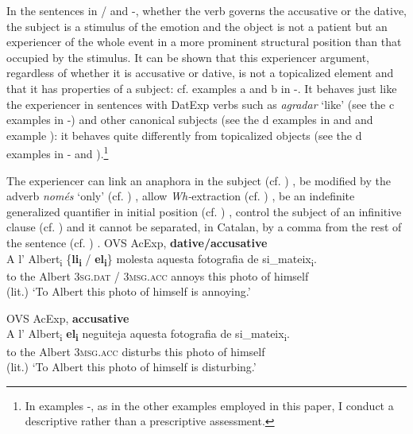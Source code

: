 \documentclass[output=paper,colorlinks,citecolor=brown,modfonts,nonflat]{langsci/langscibook}
\begin{document}
In the sentences in / and -, whether the verb governs the accusative or the dative, the subject is a stimulus of the emotion and the object is not a patient but an experiencer of the whole event in a more prominent structural position than that occupied by the stimulus. It can be shown that this experiencer argument, regardless of whether it is accusative or dative, is not a topicalized element and that it has properties of a subject: cf. examples {a} and {b} in -. It behaves just like the experiencer in sentences with DatExp verbs such as \textit{agradar} ‘like’ (see the {c} examples in -) and other canonical subjects (see the {d} examples in  and  and example ): it behaves quite differently from topicalized objects (see the {d} examples in - and ).\footnote{In examples -, as in the other examples employed in this paper, I conduct a descriptive rather than a prescriptive assessment.}

The experiencer can link an anaphora in the subject (cf. \citealt{Demonte1995, EgurenFernándezSoriano2004}) , be modified by the adverb \textit{només} ‘only’ (cf. \citealt{Cuervo1999}) , allow \textit{Wh-}extraction (cf. \citealt{BellettiRizzi1988}) , be an indefinite generalized quantifier in initial position (cf. \citealt{BellettiRizzi1988, Masullo1992quirky, Cuervo1999}) , control the subject of an infinitive clause (cf. \citealt{Campos1999, Alsina2008})  and it cannot be separated, in Catalan, by a comma from the rest of the sentence (cf. \citealt{Ginebra2003, Ginebra2005}) .
\textbf{}
\ea%
 \label{ex:royo:8}
 \ea OVS AcExp, \textbf{dative/accusative} \label{ex:royo:8a}\\
 \gll A l’ Albert\textsubscript{i} \{\textbf{li\textsubscript{i}} / \textbf{el\textsubscript{i}}\} molesta aquesta fotografia de si\_mateix\textsubscript{i}.\\
 to the Albert {\textsc{3sg.dat}} / {\textsc{3msg.acc}} annoys this photo       of himself\\
\glt (lit.) ‘To Albert this photo of himself is annoying.’
 
  
 \ex OVS AcExp, \textbf{accusative}\label{ex:royo:8c}\\
 \gll A l’ Albert\textsubscript{i} \textbf{el\textsubscript{i}} neguiteja aquesta fotografia de si\_mateix\textsubscript{i}.\\
 to the Albert  {\textsc{3msg.acc}} disturbs this photo of himself\\
\glt (lit.) ‘To Albert this photo of himself is disturbing.’
\end{document}
